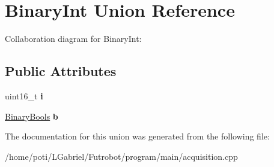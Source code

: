 \hypertarget{unionBinaryInt}{}\section{Binary\+Int Union Reference}
\label{unionBinaryInt}


Collaboration diagram for Binary\+Int\+:
\subsection*{Public Attributes}
\begin{DoxyCompactItemize}
\item 
uint16\+\_\+t {\bfseries i}\hypertarget{unionBinaryInt_a740cbfb7b907ef1774ed167df387a6b4}{}\label{unionBinaryInt_a740cbfb7b907ef1774ed167df387a6b4}

\item 
\hyperlink{structBinaryBools}{Binary\+Bools} {\bfseries b}\hypertarget{unionBinaryInt_a060ebd8228ef1d76a336943f3b482162}{}\label{unionBinaryInt_a060ebd8228ef1d76a336943f3b482162}

\end{DoxyCompactItemize}


The documentation for this union was generated from the following file\+:\begin{DoxyCompactItemize}
\item 
/home/poti/\+L\+Gabriel/\+Futrobot/program/main/acquisition.\+cpp\end{DoxyCompactItemize}
